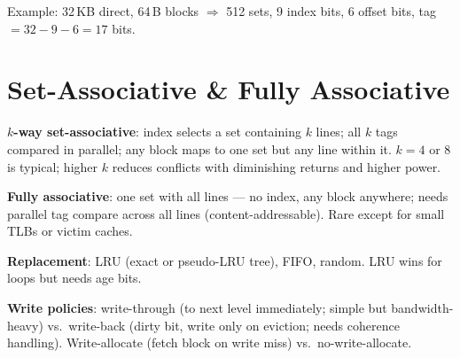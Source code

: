 Example: 32\,KB direct, 64\,B blocks $\Rightarrow$ 512 sets, 9 index bits, 6 offset bits, tag $=32-9-6=17$ bits.

\section{Set-Associative \& Fully Associative}
\textbf{$k$-way set-associative}: index selects a set containing $k$ lines; all $k$ tags compared in parallel; any block maps to one set but any line within it. $k=4$ or $8$ is typical; higher $k$ reduces conflicts with diminishing returns and higher power.

\textbf{Fully associative}: one set with all lines --- no index, any block anywhere; needs parallel tag compare across all lines (content-addressable). Rare except for small TLBs or victim caches.

\begin{center}
\end{center}
\textbf{Replacement}: LRU (exact or pseudo-LRU tree), FIFO, random. LRU wins for loops but needs age bits.

\textbf{Write policies}: write-through (to next level immediately; simple but bandwidth-heavy) vs.\ write-back (dirty bit, write only on eviction; needs coherence handling). Write-allocate (fetch block on write miss) vs.\ no-write-allocate.


